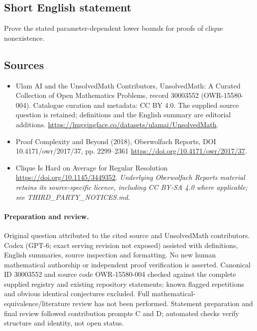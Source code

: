 \documentclass[11pt]{article}
\begin{document}
\subsection{Short English statement}
Prove the stated parameter-dependent lower bounds for proofs of clique nonexistence.
\subsection{Sources}
\begin{itemize}
\item[\hypertarget{source:30003552:1}{S1}] Ulam AI and the UnsolvedMath Contributors, UnsolvedMath: A Curated Collection of Open Mathematics Problems, record 30003552 (OWR-15580-004). Catalogue curation and metadata: CC BY 4.0. The supplied source question is retained; definitions and the English summary are editorial additions.
\url{https://huggingface.co/datasets/ulamai/UnsolvedMath}.
\item[\hypertarget{source:30003552:2}{S2}] Proof Complexity and Beyond (2018), Oberwolfach Reports, DOI 10.4171/owr/2017/37, pp. 2299--2361
\url{https://doi.org/10.4171/owr/2017/37}.
\item[\hypertarget{source:30003552:3}{S3}] Clique Is Hard on Average for Regular Resolution
\url{https://doi.org/10.1145/3449352}.
\textit{Underlying Oberwolfach Reports material retains its source-specific licence, including CC BY-SA 4.0 where applicable; see THIRD\_PARTY\_NOTICES.md.}
\end{itemize}
\paragraph{Preparation and review.}
Original question attributed to the cited source and UnsolvedMath contributors. Codex (GPT-6; exact serving revision not exposed) assisted with definitions, English summaries, source inspection and formatting. No new human mathematical authorship or independent proof verification is asserted. Canonical ID 30003552 and source code OWR-15580-004 checked against the complete supplied registry and existing repository statements; known flagged repetitions and obvious identical conjectures excluded. Full mathematical-equivalence/literature review has not been performed. Statement preparation and final review followed contribution prompts C and D; automated checks verify structure and identity, not open status.
\label{end:30003552}
\end{document}
